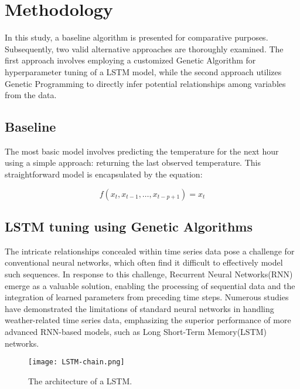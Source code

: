 
\section{Methodology}

In this study, a baseline algorithm is presented for comparative purposes. Subsequently, two valid alternative approaches are thoroughly examined. The first approach involves employing a customized Genetic Algorithm for hyperparameter tuning of a LSTM model, while the second approach utilizes Genetic Programming to directly infer potential relationships among variables from the data.

\subsection{Baseline}

The most basic model involves predicting the temperature for the next hour using a simple approach: returning the last observed temperature. This straightforward model is encapsulated by the equation:

\begin{equation}
    f(x_t, x_{t-1}, \ldots, x_{t-p+1}) = x_t
\end{equation}

\subsection{LSTM tuning using Genetic Algorithms}

The intricate relationships concealed within time series data pose a challenge for conventional neural networks, which often find it difficult to effectively model such sequences. In response to this challenge, Recurrent Neural Networks(RNN) emerge as a valuable solution, enabling the processing of sequential data and the integration of learned parameters from preceding time steps. Numerous studies have demonstrated the limitations of standard neural networks in handling weather-related time series data\cite{weather-lstm}, emphasizing the superior performance of more advanced RNN-based models, such as Long Short-Term Memory(LSTM) networks.

\begin{figure}[h]   
    \centering
    \texttt{[image: LSTM-chain.png]}
    \caption{The architecture of a LSTM.}
    \label{fig:lstm}
\end{figure}

